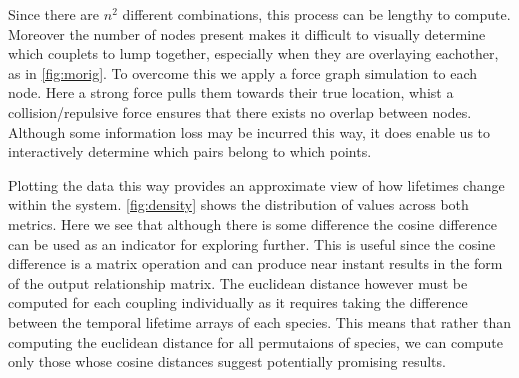 Since there are $n^2$ different combinations, this process can be lengthy to compute. Moreover the number of nodes present makes it difficult to visually determine which couplets to lump together, especially when they are overlaying eachother, as in \autoref{fig:morig}. To overcome this we apply a force graph simulation to each node. Here a strong force pulls them towards their true location, whist a collision/repulsive force ensures that there exists no overlap between nodes. Although some information loss may be incurred this way, it does enable us to interactively determine which pairs belong to which points.   

Plotting the data this way provides an approximate view of how lifetimes change within the system. \autoref{fig:density} shows the distribution of values across both metrics. Here we see that although there is some difference the cosine difference can be used as an indicator for exploring further. This is useful since the cosine difference is a matrix operation and can produce near instant results in the form of the output relationship matrix. The euclidean distance however must be computed for each coupling individually as it requires taking the difference between the temporal lifetime arrays of each species. This means that rather than computing the euclidean distance for all permutaions of species, we can compute only those whose cosine distances suggest potentially promising results.  



